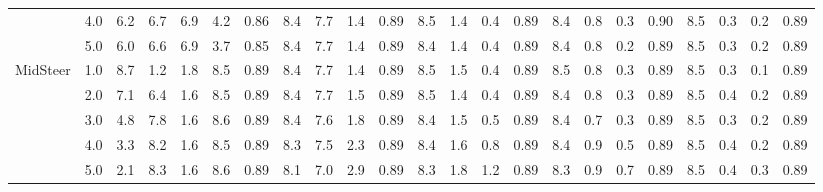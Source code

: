 \begin{table}
{\begin{tabular}{lc|cc|ccc|cccc|cccc|cccc|cccc}
 & 4.0 & 6.2 & 6.7 & 6.9 & 4.2 & 0.86 & 8.4 & 7.7 & 1.4 & 0.89 & 8.5 & 1.4 & 0.4 & 0.89 & 8.4 & 0.8 & 0.3 & 0.90 & 8.5 & 0.3 & 0.2 & 0.89 \\
 & 5.0 & 6.0 & 6.6 & 6.9 & 3.7 & 0.85 & 8.4 & 7.7 & 1.4 & 0.89 & 8.4 & 1.4 & 0.4 & 0.89 & 8.4 & 0.8 & 0.2 & 0.89 & 8.5 & 0.3 & 0.2 & 0.89 \\
\cline{1-23}
\multirow{5}{*}{MidSteer} & 1.0 & 8.7 & 1.2 & 1.8 & 8.5 & 0.89 & 8.4 & 7.7 & 1.4 & 0.89 & 8.5 & 1.5 & 0.4 & 0.89 & 8.5 & 0.8 & 0.3 & 0.89 & 8.5 & 0.3 & 0.1 & 0.89 \\
 & 2.0 & 7.1 & 6.4 & 1.6 & 8.5 & 0.89 & 8.4 & 7.7 & 1.5 & 0.89 & 8.5 & 1.4 & 0.4 & 0.89 & 8.4 & 0.8 & 0.3 & 0.89 & 8.5 & 0.4 & 0.2 & 0.89 \\
 & 3.0 & 4.8 & 7.8 & 1.6 & 8.6 & 0.89 & 8.4 & 7.6 & 1.8 & 0.89 & 8.4 & 1.5 & 0.5 & 0.89 & 8.4 & 0.7 & 0.3 & 0.89 & 8.5 & 0.3 & 0.2 & 0.89 \\
 & 4.0 & 3.3 & 8.2 & 1.6 & 8.5 & 0.89 & 8.3 & 7.5 & 2.3 & 0.89 & 8.4 & 1.6 & 0.8 & 0.89 & 8.4 & 0.9 & 0.5 & 0.89 & 8.5 & 0.4 & 0.2 & 0.89 \\
 & 5.0 & 2.1 & 8.3 & 1.6 & 8.6 & 0.89 & 8.1 & 7.0 & 2.9 & 0.89 & 8.3 & 1.8 & 1.2 & 0.89 & 8.3 & 0.9 & 0.7 & 0.89 & 8.5 & 0.4 & 0.3 & 0.89 \\
\bottomrule
\end{tabular}}
\end{table}
